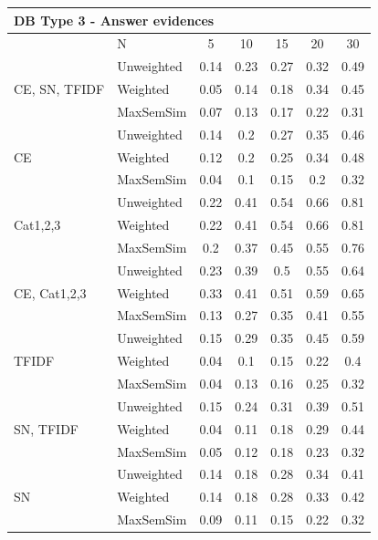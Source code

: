 \documentclass[conference]{IEEEtran}
\begin{document}
\begin{table}[!h]
\begin{tabular}{l||l|ccccc}
		\multicolumn{7}{l}{DB Type 3 - Answer evidences}\\\hline\hline
		& N & 5 & 10 & 15 & 20 & 30\\\hline
		\hline
		
		\multirow{3}{*}{CE, SN, TFIDF} & Unweighted & 0.14 & 0.23 & 0.27 & 0.32 & 0.49\\
		 & Weighted & 0.05 & 0.14 & 0.18 & 0.34 & 0.45\\
		 & MaxSemSim & 0.07 & 0.13 & 0.17 & 0.22 & 0.31\\ 
		\hline
		
		\multirow{3}{*}{CE} & Unweighted & 0.14 & 0.2 & 0.27 & 0.35 & 0.46\\
		 & Weighted & 0.12 & 0.2 & 0.25 & 0.34 & 0.48\\
		 & MaxSemSim & 0.04 & 0.1 & 0.15 & 0.2 & 0.32\\ 
		\hline
		
		\multirow{3}{*}{Cat1,2,3} & Unweighted & 0.22 & 0.41 & 0.54 & 0.66 & 0.81\\
		 & Weighted & 0.22 & 0.41 & 0.54 & 0.66 & 0.81\\
		 & MaxSemSim & 0.2 & 0.37 & 0.45 & 0.55 & 0.76\\ 
		\hline
		
		\multirow{3}{*}{CE, Cat1,2,3} & Unweighted & 0.23 & 0.39 & 0.5 & 0.55 & 0.64\\
		 & Weighted & 0.33 & 0.41 & 0.51 & 0.59 & 0.65\\
		 & MaxSemSim & 0.13 & 0.27 & 0.35 & 0.41 & 0.55\\ 
		\hline
		
		\multirow{3}{*}{TFIDF} & Unweighted & 0.15 & 0.29 & 0.35 & 0.45 & 0.59\\
		 & Weighted & 0.04 & 0.1 & 0.15 & 0.22 & 0.4\\
		 & MaxSemSim & 0.04 & 0.13 & 0.16 & 0.25 & 0.32\\ 
		\hline
		
		\multirow{3}{*}{SN, TFIDF} & Unweighted & 0.15 & 0.24 & 0.31 & 0.39 & 0.51\\
		 & Weighted & 0.04 & 0.11 & 0.18 & 0.29 & 0.44\\
		 & MaxSemSim & 0.05 & 0.12 & 0.18 & 0.23 & 0.32\\ 
		\hline
		
		\multirow{3}{*}{SN} & Unweighted & 0.14 & 0.18 & 0.28 & 0.34 & 0.41\\
		 & Weighted & 0.14 & 0.18 & 0.28 & 0.33 & 0.42\\
		 & MaxSemSim & 0.09 & 0.11 & 0.15 & 0.22 & 0.32\\ 
		\hline		
		

\end{tabular}
\end{table}
\end{document}
